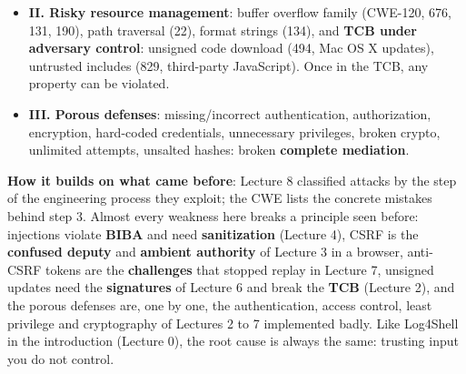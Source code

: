 \begin{recapbox}[title={Exam-ready recap --- Lecture 9: Adversarial thinking II}]
\begin{itemize}
\begin{itemize}
        \end{itemize}
  \item \textbf{II. Risky resource management}: buffer overflow family (CWE-120, 676, 131, 190),
        path traversal (22), format strings (134), and \textbf{TCB under adversary control}:
        unsigned code download (494, Mac OS X updates), untrusted includes (829, third-party
        JavaScript). Once in the TCB, any property can be violated.
  \item \textbf{III. Porous defenses}: missing/incorrect authentication, authorization, encryption,
        hard-coded credentials, unnecessary privileges, broken crypto, unlimited attempts, unsalted
        hashes: broken \textbf{complete mediation}.
\end{itemize}
\textbf{How it builds on what came before}: Lecture 8 classified attacks by the step of the
engineering process they exploit; the CWE lists the concrete mistakes behind step 3. Almost every
weakness here breaks a principle seen before: injections violate \textbf{BIBA} and need
\textbf{sanitization} (Lecture 4), CSRF is the \textbf{confused deputy} and \textbf{ambient
authority} of Lecture 3 in a browser, anti-CSRF tokens are the \textbf{challenges} that stopped
replay in Lecture 7, unsigned updates need the \textbf{signatures} of Lecture 6 and break the
\textbf{TCB} (Lecture 2), and the porous defenses are, one by one, the authentication, access
control, least privilege and cryptography of Lectures 2 to 7 implemented badly. Like Log4Shell in
the introduction (Lecture 0), the root cause is always the same: trusting input you do not control.
\end{recapbox}
